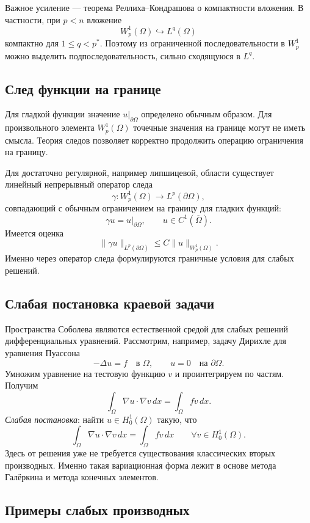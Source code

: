 Важное усиление --- теорема Реллиха--Кондрашова о компактности вложения. В
частности, при $p<n$ вложение
\[
    W_p^1(\Omega)\hookrightarrow L^q(\Omega)
\]
компактно для $1\leq q<p^*$. Поэтому из ограниченной последовательности в
$W_p^1$ можно выделить подпоследовательность, сильно сходящуюся в $L^q$.

\subsection{След функции на границе}

Для гладкой функции значение $u|_{\partial\Omega}$ определено обычным образом.
Для произвольного элемента $W_p^1(\Omega)$ точечные значения на границе могут
не иметь смысла. Теория следов позволяет корректно продолжить операцию
ограничения на границу.

Для достаточно регулярной, например липшицевой, области существует линейный
непрерывный оператор следа
\[
    \gamma:W_p^1(\Omega)\longrightarrow L^p(\partial\Omega),
\]
совпадающий с обычным ограничением на границу для гладких функций:
\[
    \gamma u=u|_{\partial\Omega},
    \qquad u\in C^1(\overline\Omega).
\]
Имеется оценка
\[
    \|\gamma u\|_{L^p(\partial\Omega)}
    \leq C\|u\|_{W_p^1(\Omega)}.
\]
Именно через оператор следа формулируются граничные условия для слабых решений.

\subsection{Слабая постановка краевой задачи}

Пространства Соболева являются естественной средой для слабых решений
дифференциальных уравнений. Рассмотрим, например, задачу Дирихле для уравнения
Пуассона
\[
    -\Delta u=f\quad\text{в }\Omega,
    \qquad u=0\quad\text{на }\partial\Omega.
\]
Умножим уравнение на тестовую функцию $v$ и проинтегрируем по частям. Получим
\[
    \int_\Omega \nabla u\cdot\nabla v\,dx
    =\int_\Omega f v\,dx.
\]
\emph{Слабая постановка}: найти $u\in H_0^1(\Omega)$ такую, что
\[
    \int_\Omega \nabla u\cdot\nabla v\,dx
    =\int_\Omega f v\,dx
    \qquad\forall v\in H_0^1(\Omega).
\]
Здесь от решения уже не требуется существования классических вторых
производных. Именно такая вариационная форма лежит в основе метода Галёркина и
метода конечных элементов.


\subsection{Примеры слабых производных}


